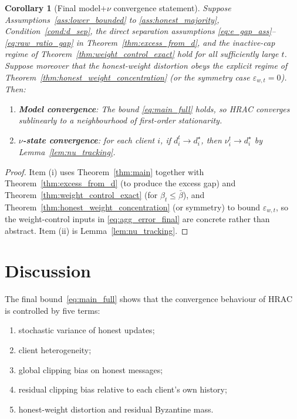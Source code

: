 \documentclass[11pt,a4paper]{article}
\newtheorem{corollary}{Corollary}
\theoremstyle{remark}
\begin{document}
\begin{corollary}[Final model+\(\nu\) convergence statement]
\label{cor:final_model_nu}
Suppose Assumptions~\ref{ass:lower_bounded} to \ref{ass:honest_majority},
Condition~\ref{cond:d_sep}, the direct separation assumptions
\eqref{eq:e_gap_ass}--\eqref{eq:raw_ratio_gap} in
Theorem~\ref{thm:excess_from_d}, and the inactive-cap regime of
Theorem~\ref{thm:weight_control_exact} hold for all sufficiently large \(t\).
Suppose moreover that the honest-weight distortion obeys the explicit
regime of Theorem~\ref{thm:honest_weight_concentration} (or the symmetry case
\(\varepsilon_{w,t}=0\)).
Then:
\begin{enumerate}[label=(\roman*)]
    \item \textbf{Model convergence}: The bound \eqref{eq:main_full} holds, so
    HRAC converges sublinearly to a neighbourhood of first-order stationarity.
    \item \textbf{\(\nu\)-state convergence}: for each client \(i\), if
    \(d_i^t\to d_i^\star\), then \(\nu_i^t\to d_i^\star\) by
    Lemma~\ref{lem:nu_tracking}.
\end{enumerate}
\end{corollary}

\begin{proof}
Item (i) uses Theorem~\ref{thm:main} together with
Theorem~\ref{thm:excess_from_d} (to produce the excess gap) and
Theorem~\ref{thm:weight_control_exact} (for \(\beta_t\le\bar\beta\)), and
Theorem~\ref{thm:honest_weight_concentration} (or symmetry) to bound
\(\varepsilon_{w,t}\), so
the weight-control inputs in \eqref{eq:agg_error_final} are concrete rather
than abstract.
Item (ii) is Lemma~\ref{lem:nu_tracking}.
\end{proof}

\section{Discussion}

The final bound~\eqref{eq:main_full} shows that the convergence behaviour of
HRAC is controlled by five terms:

\begin{enumerate}[label=\arabic*.]
    \item stochastic variance of honest updates;
    \item client heterogeneity;
    \item global clipping bias on honest messages;
    \item residual clipping bias relative to each client's own history;
    \item honest-weight distortion and residual Byzantine mass.
\end{enumerate}
\end{document}
